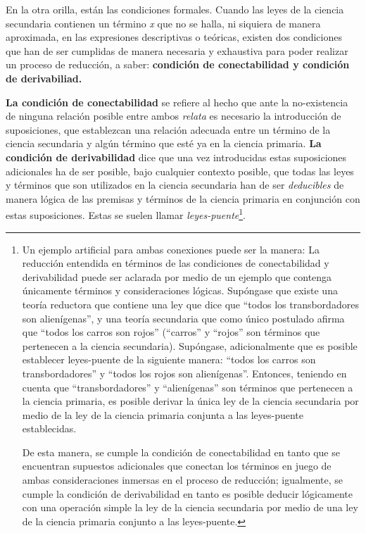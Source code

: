 \documentclass[]{book}
\begin{document}
\begin{refsection}
En la otra orilla, están las condiciones formales. Cuando las leyes de
la ciencia secundaria contienen un término \emph{x} que no se halla, ni
siquiera de manera aproximada, en las expresiones descriptivas o
teóricas, existen dos condiciones que han de ser cumplidas de manera
necesaria y exhaustiva para poder realizar un proceso de reducción, a
saber: \textbf{condición de conectabilidad y condición de derivabiliad.
}

\textbf{La condición de conectabilidad} se refiere al hecho que ante la
no-existencia de ninguna relación posible entre ambos \emph{relata} es
necesario la introducción de suposiciones, que establezcan una relación
adecuada entre un término de la ciencia secundaria y algún término que
esté ya en la ciencia primaria. \textbf{La condición de derivabilidad}
dice que una vez introducidas estas suposiciones adicionales ha de ser
posible, bajo cualquier contexto posible, que todas las leyes y términos
que son utilizados en la ciencia secundaria han de ser \emph{deducibles}
de manera lógica de las premisas y términos de la ciencia primaria en
conjunción con estas suposiciones. Estas se suelen llamar
\emph{leyes-puente}\footnote{Un ejemplo artificial para ambas conexiones
  puede ser la manera: La reducción entendida en términos de las
  condiciones de conectabilidad y derivabilidad puede ser aclarada por
  medio de un ejemplo que contenga únicamente términos y consideraciones
  lógicas. Supóngase que existe una teoría reductora que contiene una
  ley que dice que ``todos los transbordadores son alienígenas'', y una
  teoría secundaria que como único postulado afirma que ``todos los
  carros son rojos'' (``carros'' y ``rojos'' son términos que pertenecen
  a la ciencia secundaria). Supóngase, adicionalmente que es posible
  establecer leyes-puente de la siguiente manera: ``todos los carros son
  transbordadores'' y ``todos los rojos son alienígenas''. Entonces,
  teniendo en cuenta que ``transbordadores'' y ``alienígenas'' son
  términos que pertenecen a la ciencia primaria, es posible derivar la
  única ley de la ciencia secundaria por medio de la ley de la ciencia
  primaria conjunta a las leyes-puente establecidas.

  De esta manera, se cumple la condición de conectabilidad en tanto que
  se encuentran supuestos adicionales que conectan los términos en juego
  de ambas consideraciones inmersas en el proceso de reducción;
  igualmente, se cumple la condición de derivabilidad en tanto es
  posible deducir lógicamente con una operación simple la ley de la
  ciencia secundaria por medio de una ley de la ciencia primaria
  conjunto a las leyes-puente.}.


\end{refsection}
\end{document}
